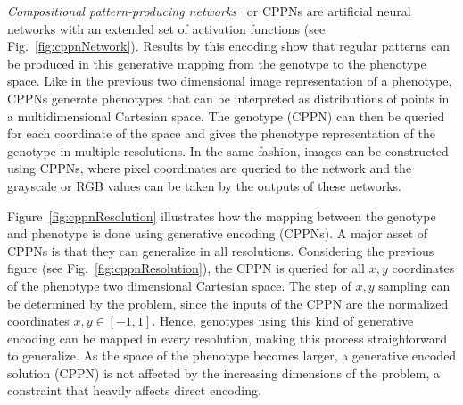 \emph{Compositional pattern-producing networks}~\citep{stanley2007compositional} or CPPNs are artificial neural networks with an extended set of activation functions (see Fig.~\ref{fig:cppnNetwork}). Results by this encoding show that regular patterns can be produced in this generative mapping from the genotype to the phenotype space. Like in the previous two dimensional image representation of a phenotype, CPPNs generate phenotypes that can be interpreted as distributions of points in a multidimensional Cartesian space. The genotype (CPPN) can then be queried for each coordinate of the space and gives the phenotype representation of the genotype in multiple resolutions. In the same fashion, images can be constructed using CPPNs, where pixel coordinates are queried to the network and the grayscale or RGB values can be taken by the outputs of these networks. 


Figure~\ref{fig:cppnResolution} illustrates how the mapping between the genotype and phenotype is done using generative encoding (CPPNs). A major asset of CPPNs is that they can generalize in all resolutions. Considering the previous figure (see Fig.~\ref{fig:cppnResolution}), the CPPN is queried for all $x,y$ coordinates of the phenotype two dimensional Cartesian space. The step of $x,y$ sampling can be determined by the problem, since the inputs of the CPPN are the normalized coordinates $x,y \in [-1,1]$. Hence, genotypes using this kind of generative encoding can be mapped in every resolution, making this process straighforward to generalize. As the space of the phenotype becomes larger, a generative encoded solution (CPPN) is not affected by the increasing dimensions of the problem, a constraint that heavily affects direct encoding.

